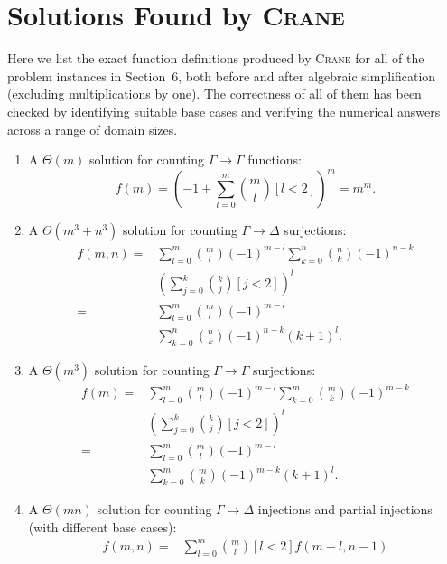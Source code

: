 \documentclass{article}
\begin{document}
\section{Solutions Found by \textsc{Crane}}\label{sec:solutions}

Here we list the exact function definitions produced by \textsc{Crane} for all
of the problem instances in Section~6, both before and after algebraic
simplification (excluding multiplications by one). The correctness of all of
them has been checked by identifying suitable base cases and verifying the
numerical answers across a range of domain sizes.

\begin{enumerate}
  \item A $\Theta(m)$ solution for counting $\Gamma \to \Gamma$ functions:
        \[
        f(m) = {\left(-1 + \sum_{l=0}^{m} \binom{m}{l} [l < 2]\right)}^{m} = m^{m}.
        \]
  \item A $\Theta(m^3 + n^3)$ solution for counting $\Gamma \to \Delta$
        surjections:
        \begin{align*}
          f(m, n) ={}& \sum_{l=0}^{m} \binom{m}{l}{(-1)}^{m-l} \sum_{k=0}^{n} \binom{n}{k} {(-1)}^{n-k}\\
                     &{\left( \sum_{j=0}^{k} \binom{k}{j} [j < 2] \right)}^{l} \\
          ={}& \sum_{l=0}^{m} \binom{m}{l}{(-1)}^{m-l}\\
                     &\sum_{k=0}^{n} \binom{n}{k} {(-1)}^{n-k} {(k+1)}^{l}.
        \end{align*}
  \item A $\Theta(m^{3})$ solution for counting $\Gamma \to \Gamma$ surjections:
        \begin{align*}
          f(m) ={}& \sum_{l=0}^{m} \binom{m}{l}{(-1)}^{m-l} \sum_{k=0}^{m} \binom{m}{k} {(-1)}^{m-k}\\
                  &{\left( \sum_{j=0}^{k} \binom{k}{j} [j < 2] \right)}^{l} \\
          ={}& \sum_{l=0}^{m} \binom{m}{l}{(-1)}^{m-l}\\
                  &\sum_{k=0}^{m} \binom{m}{k} {(-1)}^{m-k} {(k+1)}^{l}.
        \end{align*}
  \item A $\Theta(mn)$ solution for counting $\Gamma \to \Delta$ injections and
        partial injections (with different base cases):
        \begin{align*}
          f(m, n) ={}& \sum_{l=0}^m \binom{m}{l} [l<2] f(m-l, n-1)\\

\end{align*}
\end{enumerate}
\end{document}

